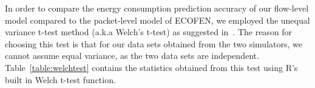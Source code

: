 In order to compare the energy consumption prediction accuracy of our flow-level model compared to the packet-level model of ECOFEN, we employed the unequal variance t-test method (a.k.a Welch's t-test) as suggested in~\cite{ruxton2006unequal}. The reason for choosing this test is that for our data sets obtained from the two simulators, we cannot assume equal variance, as the two data sets are independent. Table~\ref{table:welchtest} contains the statistics obtained from this test using R's built in Welch t-test function. 

\begin{figure}[htbp]
	\centering
\centering
	

\end{figure}
